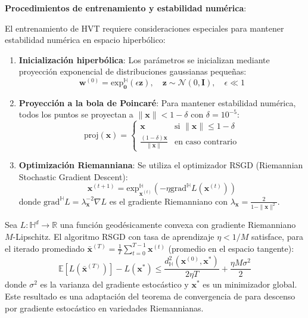 \textbf{Procedimientos de entrenamiento y estabilidad numérica}:

El entrenamiento de HVT requiere consideraciones especiales para mantener estabilidad numérica en espacio hiperbólico:

\begin{enumerate}
    \item \textbf{Inicialización hiperbólica}: Los parámetros se inicializan mediante proyección exponencial de distribuciones gaussianas pequeñas:
    \begin{equation}
    \mathbf{w}^{(0)} = \text{exp}_{\mathbf{0}}^{\mathbb{H}}(\epsilon \mathbf{z}), \quad \mathbf{z} \sim \mathcal{N}(0, \mathbf{I}), \quad \epsilon \ll 1
    \end{equation}

    \item \textbf{Proyección a la bola de Poincaré}: Para mantener estabilidad numérica, todos los puntos se proyectan a $\|\mathbf{x}\| < 1 - \delta$ con $\delta = 10^{-5}$:
    \begin{equation}
    \text{proj}(\mathbf{x}) = \begin{cases}
    \mathbf{x} & \text{si } \|\mathbf{x}\| \leq 1 - \delta \\
    \frac{(1-\delta)\mathbf{x}}{\|\mathbf{x}\|} & \text{en caso contrario}
    \end{cases}
    \end{equation}

    \item \textbf{Optimización Riemanniana}: Se utiliza el optimizador RSGD (Riemannian Stochastic Gradient Descent):
    \begin{equation}
    \mathbf{x}^{(t+1)} = \text{exp}_{\mathbf{x}^{(t)}}^{\mathbb{H}}\left(-\eta \text{grad}^{\mathbb{H}} L(\mathbf{x}^{(t)})\right)
    \end{equation}
    donde $\text{grad}^{\mathbb{H}} L = \lambda_{\mathbf{x}}^{-2} \nabla L$ es el gradiente Riemanniano con $\lambda_{\mathbf{x}} = \frac{2}{1-\|\mathbf{x}\|^2}$.
\end{enumerate}

\begin{theorem}\label{thm:hvt_convergence}
Sea $L: \mathbb{H}^d \to \mathbb{R}$ una función geodésicamente convexa con gradiente Riemanniano $M$-Lipschitz. El algoritmo RSGD con tasa de aprendizaje $\eta < 1/M$ satisface, para el iterado promediado $\bar{\mathbf{x}}^{(T)} = \frac{1}{T}\sum_{t=0}^{T-1} \mathbf{x}^{(t)}$ (promedio en el espacio tangente):
\begin{equation}
\mathbb{E}[L(\bar{\mathbf{x}}^{(T)})] - L(\mathbf{x}^*) \leq \frac{d_{\mathbb{H}}^2(\mathbf{x}^{(0)}, \mathbf{x}^*)}{2\eta T} + \frac{\eta M \sigma^2}{2}
\end{equation}
donde $\sigma^2$ es la varianza del gradiente estocástico y $\mathbf{x}^*$ es un minimizador global. Este resultado es una adaptación del teorema de convergencia de \citet{bonnabel2013stochastic} para descenso por gradiente estocástico en variedades Riemannianas.
\end{theorem}

